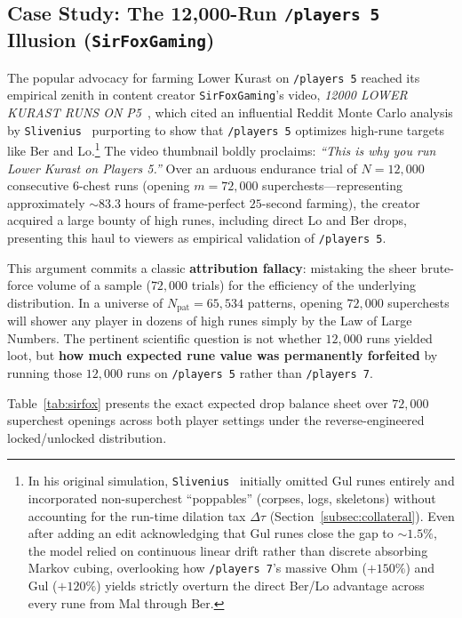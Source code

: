 \documentclass[11pt,reqno]{amsart}
\theoremstyle{definition}
\begin{document}
\subsection{Case Study: The 12,000-Run \texttt{/players~5} Illusion (\texttt{SirFoxGaming})}
\label{subsec:sirfox}

The popular advocacy for farming Lower Kurast on \texttt{/players~5} reached its empirical zenith in content creator \texttt{SirFoxGaming}'s video, \emph{12000 LOWER KURAST RUNS ON P5}~\cite{sirfox2023}, which cited an influential Reddit Monte Carlo analysis by \texttt{Slivenius}~\cite{slivenius2024} purporting to show that \texttt{/players~5} optimizes high-rune targets like Ber and Lo.\footnote{In his original simulation, \texttt{Slivenius}~\cite{slivenius2024} initially omitted Gul runes entirely and incorporated non-superchest ``poppables'' (corpses, logs, skeletons) without accounting for the run-time dilation tax $\Delta\tau$ (Section~\ref{subsec:collateral}). Even after adding an edit acknowledging that Gul runes close the gap to $\sim 1.5\%$, the model relied on continuous linear drift rather than discrete absorbing Markov cubing, overlooking how \texttt{/players~7}'s massive Ohm ($+150\%$) and Gul ($+120\%$) yields strictly overturn the direct Ber/Lo advantage across every rune from Mal through Ber.} The video thumbnail boldly proclaims: \emph{``This is why you run Lower Kurast on Players 5.''} Over an arduous endurance trial of $N = 12{,}000$ consecutive $6$-chest runs (opening $m = 72{,}000$ superchests—representing approximately $\sim 83.3\text{ hours}$ of frame-perfect $25$-second farming), the creator acquired a large bounty of high runes, including direct Lo and Ber drops, presenting this haul to viewers as empirical validation of \texttt{/players~5}.

This argument commits a classic \textbf{attribution fallacy}: mistaking the sheer brute-force volume of a sample ($72{,}000$ trials) for the efficiency of the underlying distribution. In a universe of $N_{\text{pat}} = 65{,}534$ patterns, opening $72{,}000$ superchests will shower any player in dozens of high runes simply by the Law of Large Numbers. The pertinent scientific question is not whether $12{,}000$ runs yielded loot, but \textbf{how much expected rune value was permanently forfeited} by running those $12{,}000$ runs on \texttt{/players~5} rather than \texttt{/players~7}.

Table~\ref{tab:sirfox} presents the exact expected drop balance sheet over $72{,}000$ superchest openings across both player settings under the reverse-engineered locked/unlocked distribution.
\end{document}

